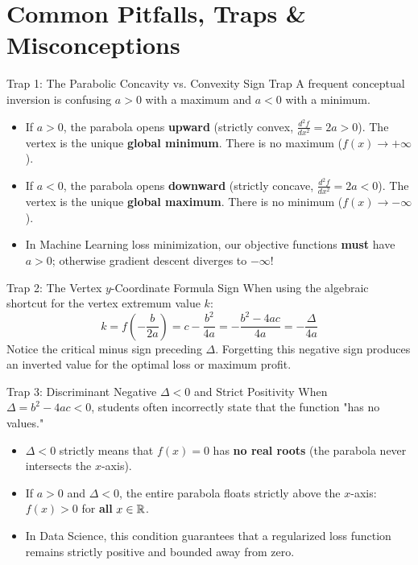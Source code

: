 \section{Common Pitfalls, Traps \& Misconceptions}

\begin{trapbox}{Trap 1: The Parabolic Concavity vs. Convexity Sign Trap}
A frequent conceptual inversion is confusing $a > 0$ with a maximum and $a < 0$ with a minimum.
\begin{itemize}
    \item If $a > 0$, the parabola opens \textbf{upward} (strictly convex, $\frac{d^2 f}{dx^2} = 2a > 0$). The vertex is the unique \textbf{global minimum}. There is no maximum ($f(x) \to +\infty$).
    \item If $a < 0$, the parabola opens \textbf{downward} (strictly concave, $\frac{d^2 f}{dx^2} = 2a < 0$). The vertex is the unique \textbf{global maximum}. There is no minimum ($f(x) \to -\infty$).
    \item In Machine Learning loss minimization, our objective functions \textbf{must} have $a > 0$; otherwise gradient descent diverges to $-\infty$!
\end{itemize}
\end{trapbox}

\begin{trapbox}{Trap 2: The Vertex $y$-Coordinate Formula Sign}
When using the algebraic shortcut for the vertex extremum value $k$:
$$k = f\left(-\frac{b}{2a}\right) = c - \frac{b^2}{4a} = -\frac{b^2 - 4ac}{4a} = -\frac{\Delta}{4a}$$
Notice the critical minus sign preceding $\Delta$. Forgetting this negative sign produces an inverted value for the optimal loss or maximum profit.
\end{trapbox}

\begin{trapbox}{Trap 3: Discriminant Negative $\Delta < 0$ and Strict Positivity}
When $\Delta = b^2 - 4ac < 0$, students often incorrectly state that the function "has no values."
\begin{itemize}
    \item $\Delta < 0$ strictly means that $f(x) = 0$ has \textbf{no real roots} (the parabola never intersects the $x$-axis).
    \item If $a > 0$ and $\Delta < 0$, the entire parabola floats strictly above the $x$-axis: $f(x) > 0$ for \textbf{all} $x \in \mathbb{R}$.
    \item In Data Science, this condition guarantees that a regularized loss function remains strictly positive and bounded away from zero.
\end{itemize}
\end{trapbox}

